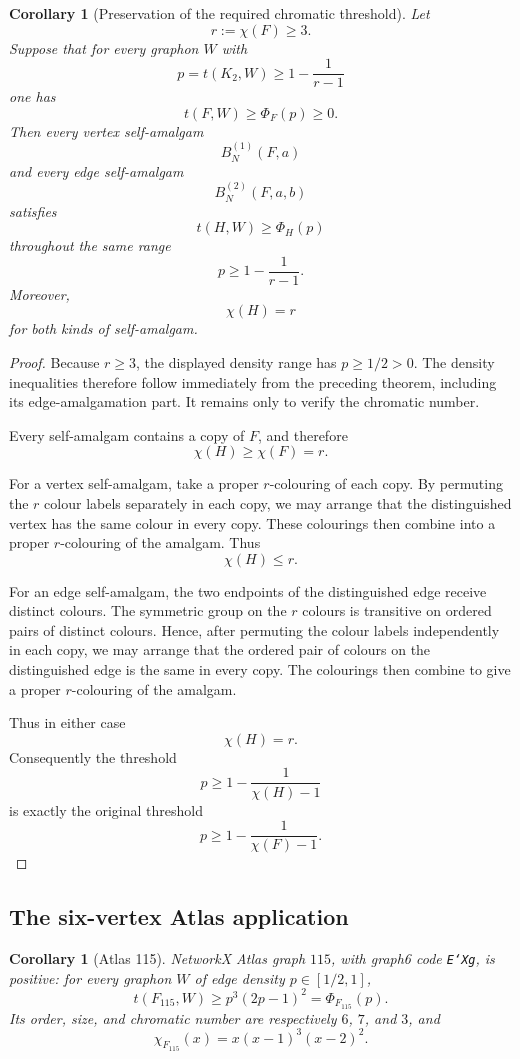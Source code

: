 \documentclass[11pt]{article}
\newtheorem{corollary}[theorem]{Corollary}
\begin{document}
\begin{corollary}[Preservation of the required chromatic threshold]
Let
\[
    r:=\chi(F)\ge3.
\]
Suppose that for every graphon $W$ with
\[
    p=t(K_2,W)\ge1-\frac1{r-1}
\]
one has
\[
    t(F,W)\ge\Phi_F(p)\ge0.
\]
Then every vertex self-amalgam
\[
    B_N^{(1)}(F,a)
\]
and every edge self-amalgam
\[
    B_N^{(2)}(F,a,b)
\]
satisfies
\[
    t(H,W)\ge\Phi_H(p)
\]
throughout the same range
\[
    p\ge1-\frac1{r-1}.
\]
Moreover,
\[
    \chi(H)=r
\]
for both kinds of self-amalgam.
\end{corollary}

\begin{proof}
Because $r\ge3$, the displayed density range has $p\ge1/2>0$.
The density inequalities therefore follow immediately from the preceding
theorem, including its edge-amalgamation part.
It remains only to verify the chromatic number.

Every self-amalgam contains a copy of $F$, and therefore
\[
    \chi(H)\ge\chi(F)=r.
\]

For a vertex self-amalgam, take a proper $r$-colouring of each copy.
By permuting the $r$ colour labels separately in each copy, we may
arrange that the distinguished vertex has the same colour in every
copy. These colourings then combine into a proper $r$-colouring of the
amalgam. Thus
\[
    \chi(H)\le r.
\]

For an edge self-amalgam, the two endpoints of the distinguished edge
receive distinct colours. The symmetric group on the $r$ colours is
transitive on ordered pairs of distinct colours. Hence, after
permuting the colour labels independently in each copy, we may arrange
that the ordered pair of colours on the distinguished edge is the
same in every copy. The colourings then combine to give a proper
$r$-colouring of the amalgam.

Thus in either case
\[
    \chi(H)=r.
\]
Consequently the threshold
\[
    p\ge1-\frac1{\chi(H)-1}
\]
is exactly the original threshold
\[
    p\ge1-\frac1{\chi(F)-1}.
\]
\end{proof}

\subsection{The six-vertex Atlas application}

\begin{corollary}[Atlas 115]\label{cor:atlas115}
NetworkX Atlas graph $115$, with graph6 code \texttt{E`Xg}, is positive:
for every graphon $W$ of edge density $p\in[1/2,1]$,
\[
    t(F_{115},W)\geq p^3(2p-1)^2
    =\Phi_{F_{115}}(p).
\]
Its order, size, and chromatic number are respectively $6$, $7$, and $3$,
and
\[
    \chi_{F_{115}}(x)=x(x-1)^3(x-2)^2.
\]
\end{corollary}
\end{document}
